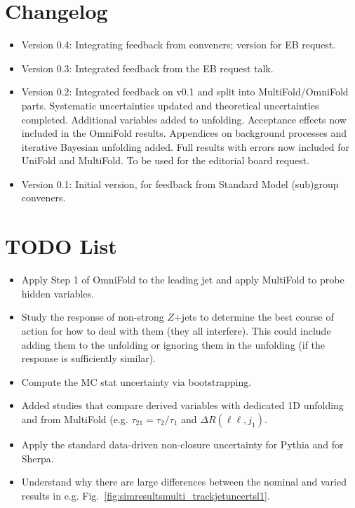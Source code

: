 \section{Changelog}

\begin{itemize}
\item Version 0.4: Integrating feedback from conveners; version for EB request.
\item Version 0.3: Integrated feedback from the EB request talk.
\item Version 0.2: Integrated feedback on v0.1 and split into MultiFold/OmniFold parts. Systematic uncertainties updated and theoretical uncertainties completed. Additional variables added to unfolding. Acceptance effects now included in the OmniFold results. Appendices on background processes and iterative Bayesian unfolding added.  Full results with errors now included for UniFold and MultiFold. To be used for the editorial board request.
\item Version 0.1: Initial version, for feedback from Standard Model (sub)group conveners.
\end{itemize}

\section{TODO List}
\label{sec:todo}

\begin{itemize}
\item Apply Step 1 of OmniFold to the leading jet and apply MultiFold to probe hidden variables.
\item Study the response of non-strong $Z$+jets to determine the best course of action for how to deal with them (they all interfere).   This could include adding them to the unfolding or ignoring them in the unfolding (if the response is sufficiently similar).
\item Compute the MC stat uncertainty via bootstrapping.
\item Added studies that compare derived variables with dedicated 1D unfolding and from MultiFold (e.g. $\tau_{21}=\tau_2/\tau_1$ and $\Delta R(\ell\ell,j_1)$.
\item Apply the standard data-driven non-closure uncertainty for Pythia and for Sherpa.
\item Understand why there are large differences between the nominal and varied results in e.g. Fig.~\ref{fig:simresultsmulti_trackjetuncertsl1}.
\end{itemize}